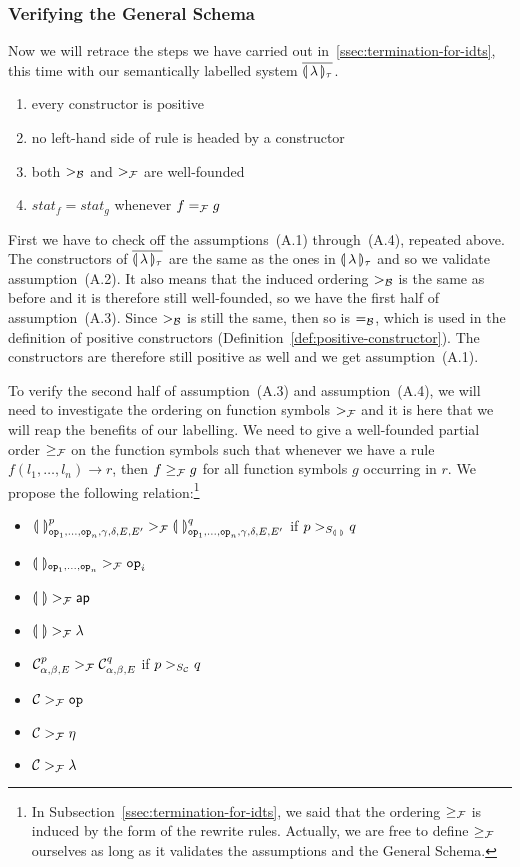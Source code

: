 \subsubsection{Verifying the General Schema}
\label{sssec:general-schema-2}

Now we will retrace the steps we have carried out
in~\ref{ssec:termination-for-idts}, this time with our semantically
labelled system ${\overline{\llparenthesis \, \lambda \, \rrparenthesis_\tau}}$.

\begin{enumerate}
  \item every constructor is positive
  \item no left-hand side of rule is headed by a constructor
  \item both $>_{\mathcal{B}}$ and $>_{\mathcal{F}}$ are well-founded
  \item $stat_f = stat_g$ whenever $f =_{\mathcal{F}} g$
\end{enumerate}

First we have to check off the assumptions~(A.1) through~(A.4), repeated
above. The constructors of ${\overline{\llparenthesis \, \lambda \, \rrparenthesis_\tau}}$ are the same as the ones in ${\llparenthesis \, \lambda \, \rrparenthesis_\tau}$
and so we validate assumption~(A.2). It also means that the induced
ordering $>_{\mathcal{B}}$ is the same as before and it is therefore still
well-founded, so we have the first half of assumption~(A.3). Since $>_{\mathcal{B}}$
is still the same, then so is $=_{\mathcal{B}}$, which is used in the definition of
positive constructors (Definition~\ref{def:positive-constructor}). The
constructors are therefore still positive as well and we get
assumption~(A.1).

To verify the second half of assumption~(A.3) and assumption~(A.4), we will
need to investigate the ordering on function symbols $>_{\mathcal{F}}$ and it is here
that we will reap the benefits of our labelling. We need to give a
well-founded partial order $\ge_{\mathcal{F}}$ on the function symbols such that
whenever we have a rule $f(l_1, \ldots, l_n) \to r$, then $f \ge_{\mathcal{F}} g$ for
all function symbols $g$ occurring in $r$. We propose the following
relation:\footnote{In Subsection~\ref{ssec:termination-for-idts}, we said
  that the ordering $\ge_{\mathcal{F}}$ is induced by the form of the rewrite
  rules. Actually, we are free to define $\ge_{\mathcal{F}}$ ourselves as long as it
  validates the assumptions and the General Schema.}

\begin{itemize}
\item $\llparenthesis \,  \, \rrparenthesis^p_{\mathtt{op}_1, \ldots, \mathtt{op}_n, \gamma, \delta, E, E'}
  >_{\mathcal{F}} \llparenthesis \,  \, \rrparenthesis^q_{\mathtt{op}_1, \ldots, \mathtt{op}_n, \gamma, \delta, E, E'}$
  if $p >_{S_{\llparenthesis \,  \, \rrparenthesis}} q$
\item $\llparenthesis \,  \, \rrparenthesis_{\mathtt{op}_1, \ldots, \mathtt{op}_n} >_{\mathcal{F}} \mathtt{op}_i$
\item $\llparenthesis \,  \, \rrparenthesis >_{\mathcal{F}} \mathsf{ap}$
\item $\llparenthesis \,  \, \rrparenthesis >_{\mathcal{F}} \lambda$
\item $\mathcal{C}^p_{\alpha,\beta,E} >_{\mathcal{F}} \mathcal{C}^q_{\alpha,\beta,E}$ if
  $p >_{S_{\mathcal{C}}} q$
\item $\mathcal{C} >_{\mathcal{F}} \mathtt{op}$
\item $\mathcal{C} >_{\mathcal{F}} \eta$
\item $\mathcal{C} >_{\mathcal{F}} \lambda$
\end{itemize}

